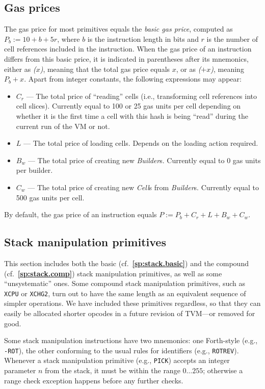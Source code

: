 \documentclass[12pt,oneside]{article}
\def\refpoint#1{{\rm\textbf{\ref{#1}}}}
\let\ptref=\refpoint
\def\mysubsection#1{\subsection{#1}\fancyhead[C]{\small{\textsc{\textrm{\thesubsection.} #1}}}}
\begin{document}
\mysubsection{Gas prices}
\def\gas#1{{\em ($#1$)}}
 The gas price for most primitives equals the {\em basic gas price}, computed as $P_b:=10+b+5r$, where $b$ is the instruction length in bits and $r$ is the number of cell references included in the instruction. When the gas price of an instruction differs from this basic price, it is indicated in parentheses after its mnemonics, either as \gas{x}, meaning that the total gas price equals $x$, or as \gas{+x}, meaning $P_b+x$. Apart from integer constants, the following expressions may appear:
\begin{itemize}
\item $C_r$ --- The total price of ``reading'' cells (i.e., transforming cell references into cell slices). Currently equal to 100 or 25 gas units per cell depending on whether it is the first time a cell with this hash is being ``read'' during the current run of the VM or not.
\item $L$ --- The total price of loading cells. Depends on the loading action required.
\item $B_w$ --- The total price of creating new {\em Builder\/}s. Currently equal to 0 gas units per builder.
\item $C_w$ --- The total price of creating new {\em Cell\/}s from {\em Builder\/}s. Currently equal to 500 gas units per cell.
\end{itemize}
By default, the gas price of an instruction equals $P:=P_b+C_r+L+B_w+C_w$.

\mysubsection{Stack manipulation primitives}

This section includes both the basic (cf.~\ptref{sp:stack.basic}) and the compound (cf.~\ptref{sp:stack.comp}) stack manipulation primitives, as well as some ``unsystematic'' ones. Some compound stack manipulation primitives, such as {\tt XCPU} or {\tt XCHG2}, turn out to have the same length as an equivalent sequence of simpler operations. We have included these primitives regardless, so that they can easily be allocated shorter opcodes in a future revision of TVM---or removed for good.

Some stack manipulation instructions have two mnemonics: one Forth-style (e.g., {\tt -ROT}), the other conforming to the usual rules for identifiers (e.g., {\tt ROTREV}). Whenever a stack manipulation primitive (e.g., {\tt PICK}) accepts an integer parameter $n$ from the stack, it must be within the range $0\dots255$; otherwise a range check exception happens before any further checks.
\end{document}
